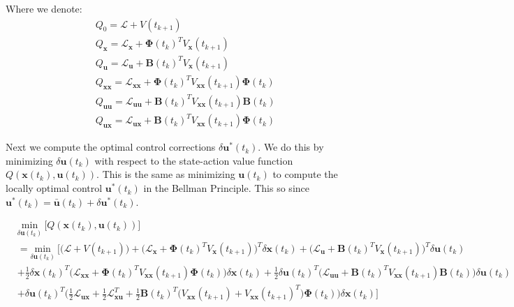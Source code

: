 \documentclass[11pt]{homework}
\renewcommand{\vec}[1]{\ensuremath{\boldsymbol{#1}}}
\begin{document}
\begin{arabicparts}
		Where we denote: 
		\begin{align*}
			& Q_{0} = \mathcal{L} +  V(t_{k+1})  \\
			& Q_{\vec{x}} = \mathcal{L}_{\vec{x}} + \vec{\Phi}(t_{k})^{T}V_{\vec{x}}(t_{k+1}) \\
			& Q_{\vec{u}} = \mathcal{L}_{\vec{u}} + \vec{B}(t_{k})^{T}V_{\vec{x}}(t_{k+1}) \\
			& Q_{\vec{xx}} = \mathcal{L}_{\vec{xx}} + \vec{\Phi}(t_{k})^{T}V_{\vec{xx}}(t_{k+1})\vec{\Phi}(t_{k}) \\
			& Q_{\vec{uu}} = \mathcal{L}_{\vec{uu}} + \vec{B}(t_{k})^{T}V_{\vec{xx}}(t_{k+1})\vec{B}(t_{k}) \\
			& Q_{\vec{ux}} = \mathcal{L}_{\vec{ux}} + \vec{B}(t_{k})^{T}V_{\vec{xx}}(t_{k+1})\vec{\Phi}(t_{k}) 
		\end{align*}
	
	\newpage
		\questionpart
		
	
		Next we compute the optimal control corrections $\delta\vec{u}^{*}(t_{k})$. We do this by minimizing $\delta\vec{u}(t_{k})$ with respect to the state-action value function $Q(\vec{x}(t_{k}), \vec{u}(t_{k}))$. This is the same as minimizing $\vec{u}(t_{k})$ to compute the locally optimal control $\vec{u}^{*}(t_{k})$ in the Bellman Principle. This so since $\vec{u}^{*}(t_{k}) = \bar{\vec{u}}(t_{k}) + \delta\vec{u}^{*}(t_{k})$. 

			\begin{align*}
				& \underset{\delta\vec{u}(t_{k})}{\text{min}} ~ \Bigg[ Q(\vec{x}(t_{k}), \vec{u}(t_{k})) \Bigg] \\
				& = \underset{\delta\vec{u}(t_{k})}{\text{min}} ~ \Bigg[ \Big(\mathcal{L} +  V(t_{k+1})  \Big) + \Big(\mathcal{L}_{\vec{x}} + \vec{\Phi}(t_{k})^{T}V_{\vec{x}}(t_{k+1}) \Big)^{T}\delta\vec{x}(t_{k})  + \Big(\mathcal{L}_{\vec{u}} + \vec{B}(t_{k})^{T}V_{\vec{x}}(t_{k+1})\Big)^{T}\delta\vec{u}(t_{k}) \\
				& + \frac{1}{2}\delta\vec{x}(t_{k})^{T}\Big( \mathcal{L}_{\vec{xx}} + \vec{\Phi}(t_{k})^{T}V_{\vec{xx}}(t_{k+1})\vec{\Phi}(t_{k})\Big)\delta\vec{x}(t_{k}) + \frac{1}{2}\delta\vec{u}(t_{k})^{T}\Big( \mathcal{L}_{\vec{uu}} + \vec{B}(t_{k})^{T}V_{\vec{xx}}(t_{k+1})\vec{B}(t_{k})\Big)\delta\vec{u}(t_{k}) \\
				& + \delta\vec{u}(t_{k})^{T}\Bigg( \frac{1}{2}\mathcal{L}_{\vec{ux}} + \frac{1}{2}\mathcal{L}_{\vec{xu}}^{T} + \frac{1}{2}\vec{B}(t_{k})^{T}\Big(V_{\vec{xx}}(t_{k+1}) + V_{\vec{xx}}(t_{k+1})^{T}\Big) \vec{\Phi}(t_{k})\Bigg)\delta\vec{x}(t_{k})\Bigg]
			\end{align*}
			

\end{arabicparts}
\end{document}
